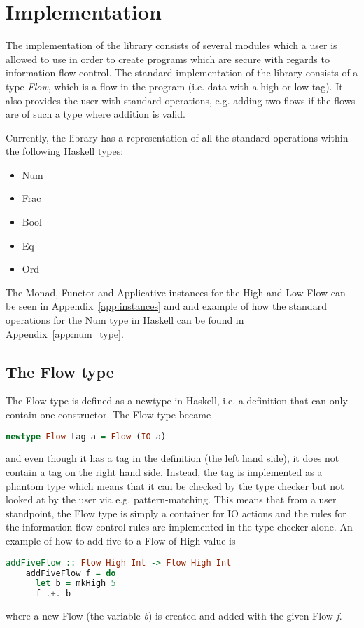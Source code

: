 \section{Implementation}
\label{chapter:implementation}
The implementation of the library consists of several modules which a user is allowed to use in order to create programs which are secure with regards to information flow control. The standard implementation of the library consists of a type \emph{Flow}, which is a flow in the program (i.e. data with a high or low tag). It also provides the user with standard operations, e.g. adding two flows if the flows are of such a type where addition is valid.

Currently, the library has a representation of all the standard operations within the following Haskell types:
\begin{itemize}
  \item Num
  \item Frac
  \item Bool
  \item Eq
  \item Ord
\end{itemize}

The Monad, Functor and Applicative instances for the High and Low Flow can be seen in Appendix~\ref{app:instances} and and example of how the standard operations for the Num type in Haskell can be found in Appendix~\ref{app:num_type}.
\subsection{The Flow type}
\label{sec:flow}
The Flow type is defined as a newtype in Haskell, i.e. a definition that can only contain one constructor. The Flow type became
\begin{center}
  \begin{lstlisting}[language=Haskell]
    newtype Flow tag a = Flow (IO a)
  \end{lstlisting}
\end{center}
and even though it has a tag in the definition (the left hand side), it does not contain a tag on the right hand side. Instead, the tag is implemented as a phantom type\cite{haskell_phantom} which means that it can be checked by the type checker but not looked at by the user via e.g. pattern-matching. This means that from a user standpoint, the Flow type is simply a container for IO actions and the rules for the information flow control rules are implemented in the type checker alone. An example of how to add five to a Flow of High value is
\begin{center}
  \begin{lstlisting}[language=Haskell]
    addFiveFlow :: Flow High Int -> Flow High Int
    addFiveFlow f = do
      let b = mkHigh 5
      f .+. b
  \end{lstlisting}
\end{center}
where a new Flow (the variable \emph{b}) is created and added with the given Flow \emph{f}.

